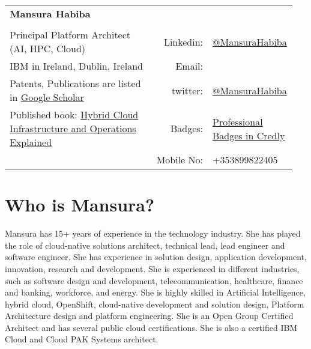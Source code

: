 \documentclass[12pt,]{scrartcl}
\date{}
\begin{document}
\begin{table}[h]
{\def\arraystretch{1.2}\tabcolsep=0pt
\begin{tabular}{p{0.50\linewidth}p{0.20\linewidth}p{0.25\linewidth}}

  \multirow{1}{*}{\LARGE \textbf{Mansura Habiba}} &  &  \\
  
  & & \\
  
Principal Platform Architect (AI, HPC, Cloud) & \multicolumn{1}{r}{Linkedin:\;\;}  & \multicolumn{1}{l}{\href{https://www.linkedin.com/in/mansura-h-a0174a19}{@MansuraHabiba}} \\
  
  IBM in Ireland, Dublin, Ireland & \multicolumn{1}{r}{Email:\;\;} &\multicolumn{1}{l}{\href{}{}} \\


  Patents, Publications are listed in \href{https://scholar.google.com/citations?user=oee3rpwAAAAJ}{Google Scholar} & \multicolumn{1}{r}{twitter:\;\;}  & \multicolumn{1}{l}{\href{https://twitter.com/MansuraHabiba}{@MansuraHabiba}} \\

Published book: \href{https://packt.link/a/9781803248318}{Hybrid Cloud Infrastructure and Operations Explained} & \multicolumn{1}{r}{ Badges:\;\;}  & \multicolumn{1}{l}{\href{https://www.credly.com/users/mansura-habiba/badges}{Professional Badges in Credly}}\\

 & \multicolumn{1}{r}{ Mobile No:\;\;}  & \multicolumn{1}{l}{+353899822405}\\
\end{tabular}%
}
\end{table}

\vspace{0.3cm}

\section*{Who is Mansura?}

Mansura has 15+ years of experience in the technology industry. She has played the role of cloud-native solutions architect, technical lead, lead engineer and software engineer. She has experience in solution design, application development, innovation, research and development. She is experienced in different industries, such as software design and development, telecommunication, healthcare, finance and banking, workforce, and energy. She is highly skilled in Artificial Intelligence, hybrid cloud, OpenShift, cloud-native development and solution design, Platform Architecture design and platform engineering.  She is an Open Group Certified Architect and has several public cloud certifications. She is also a certified IBM Cloud and Cloud PAK Systems architect.
\end{document}
